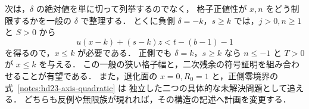 次は，$\delta$ の絶対値を単に切って列挙するのでなく，
格子正値性が $x,n$ をどう制限するかを一般の $\delta$ で整理する．
とくに負側 $\delta=-k$，$s\ge k$ では，$j>0,n\ge1$ と $S>0$ から
\[
 u(x-k)+(s-k)z<t-(b-1)-1
\]
を得るので，$x\le k$ が必要である．
正側でも $\delta=k$，$s\ge k$ なら $n\le-1$ と $T>0$ が $x\le k$ を与える．
この一般の狭い格子幅と，二次残余の符号証明を組み合わせることが有望である．
また，退化面の $x=0,R_0=1$ と，正側零境界の式~\eqref{notes:hd23-axis-quadratic} は
独立した二つの具体的な未解決問題として追える．
どちらも反例や無限族が現れれば，その構造の記述へ計画を変更する．
